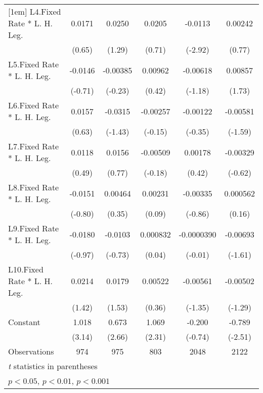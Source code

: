 {\begin{longtable}{l*{5}{c}}
[1em]
L4.Fixed Rate * L. H. Leg.&   0.0171         &   0.0250         &   0.0205         &  -0.0113\sym{**} &  0.00242         \\
                &   (0.65)         &   (1.29)         &   (0.71)         &  (-2.92)         &   (0.77)         \\
[1em]
L5.Fixed Rate * L. H. Leg.&  -0.0146         & -0.00385         &  0.00962         & -0.00618         &  0.00857         \\
                &  (-0.71)         &  (-0.23)         &   (0.42)         &  (-1.18)         &   (1.73)         \\
[1em]
L6.Fixed Rate * L. H. Leg.&   0.0157         &  -0.0315         & -0.00257         & -0.00122         & -0.00581         \\
                &   (0.63)         &  (-1.43)         &  (-0.15)         &  (-0.35)         &  (-1.59)         \\
[1em]
L7.Fixed Rate * L. H. Leg.&   0.0118         &   0.0156         & -0.00509         &  0.00178         & -0.00329         \\
                &   (0.49)         &   (0.77)         &  (-0.18)         &   (0.42)         &  (-0.62)         \\
[1em]
L8.Fixed Rate * L. H. Leg.&  -0.0151         &  0.00464         &  0.00231         & -0.00335         & 0.000562         \\
                &  (-0.80)         &   (0.35)         &   (0.09)         &  (-0.86)         &   (0.16)         \\
[1em]
L9.Fixed Rate * L. H. Leg.&  -0.0180         &  -0.0103         & 0.000832         &-0.0000390         & -0.00693         \\
                &  (-0.97)         &  (-0.73)         &   (0.04)         &  (-0.01)         &  (-1.61)         \\
[1em]
L10.Fixed Rate * L. H. Leg.&   0.0214         &   0.0179         &  0.00522         & -0.00561         & -0.00502         \\
                &   (1.42)         &   (1.53)         &   (0.36)         &  (-1.35)         &  (-1.29)         \\
[1em]
Constant        &    1.018\sym{**} &    0.673\sym{**} &    1.069\sym{*}  &   -0.200         &   -0.789\sym{*}  \\
                &   (3.14)         &   (2.66)         &   (2.31)         &  (-0.74)         &  (-2.51)         \\
\hline
Observations    &      974         &      975         &      803         &     2048         &     2122         \\
\hline\hline
\multicolumn{6}{l}{\footnotesize \textit{t} statistics in parentheses}\\
\multicolumn{6}{l}{\footnotesize \sym{*} \(p<0.05\), \sym{**} \(p<0.01\), \sym{***} \(p<0.001\)}\\
\end{longtable}
}
